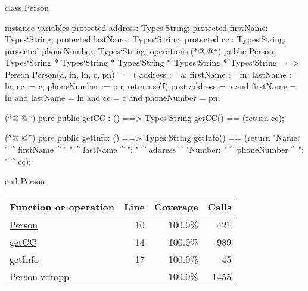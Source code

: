 \begin{vdmpp}[breaklines=true]
class Person

instance variables
  protected address: Types`String;
  protected firstName: Types`String;
  protected lastName: Types`String;
  protected cc : Types`String;
  protected phoneNumber: Types`String;
operations
(*@
\label{Person:10}
@*)
 public Person: Types`String * Types`String * Types`String * Types`String * Types`String ==> Person
  Person(a, fn, ln, c, pn) == ( address := a; firstName := fn; lastName := ln; cc := c; phoneNumber := pn; return self)
 post address = a and firstName = fn and lastName = ln and cc = c and phoneNumber = pn;
  
(*@
\label{getCC:14}
@*)
 pure public getCC : () ==> Types`String
  getCC() == (return cc);
  
(*@
\label{getInfo:17}
@*)
 pure public getInfo: () ==> Types`String
  getInfo() == (return "Name: " ^ firstName ^ " " ^ lastName ^ "\nAddress: " ^ address ^ "\nPhone Number: " ^ phoneNumber ^ "\nCC: " ^ cc);

end Person
\end{vdmpp}
\bigskip
\begin{longtable}{|l|r|r|r|}
\hline
Function or operation & Line & Coverage & Calls \\
\hline
\hline
\hyperref[Person:10]{Person} & 10&100.0\% & 421 \\
\hline
\hyperref[getCC:14]{getCC} & 14&100.0\% & 989 \\
\hline
\hyperref[getInfo:17]{getInfo} & 17&100.0\% & 45 \\
\hline
\hline
Person.vdmpp & & 100.0\% & 1455 \\
\hline
\end{longtable}

